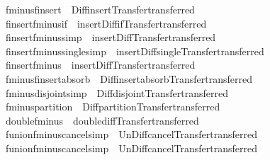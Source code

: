 \begin{isabellebody}
\isamarkupfalse%
\ fminus{\isacharunderscore}finsert{}\ {\isacharequal}\ Diff{\isacharunderscore}insert{}{\isacharbrackleft}Transfer{\isachardot}transferred{\isacharbrackright}\isanewline
{}\isamarkupfalse%
\ finsert{\isacharunderscore}fminus{\isacharunderscore}if\ {\isacharequal}\ insert{\isacharunderscore}Diff{\isacharunderscore}if{\isacharbrackleft}Transfer{\isachardot}transferred{\isacharbrackright}\isanewline
{}\isamarkupfalse%
\ finsert{\isacharunderscore}fminus{}{\isacharbrackleft}simp{\isacharbrackright}\ {\isacharequal}\ insert{\isacharunderscore}Diff{}{\isacharbrackleft}Transfer{\isachardot}transferred{\isacharbrackright}\isanewline
{}\isamarkupfalse%
\ finsert{\isacharunderscore}fminus{\isacharunderscore}single{\isacharbrackleft}simp{\isacharbrackright}\ {\isacharequal}\ insert{\isacharunderscore}Diff{\isacharunderscore}single{\isacharbrackleft}Transfer{\isachardot}transferred{\isacharbrackright}\isanewline
{}\isamarkupfalse%
\ finsert{\isacharunderscore}fminus\ {\isacharequal}\ insert{\isacharunderscore}Diff{\isacharbrackleft}Transfer{\isachardot}transferred{\isacharbrackright}\isanewline
{}\isamarkupfalse%
\ fminus{\isacharunderscore}finsert{\isacharunderscore}absorb\ {\isacharequal}\ Diff{\isacharunderscore}insert{\isacharunderscore}absorb{\isacharbrackleft}Transfer{\isachardot}transferred{\isacharbrackright}\isanewline
{}\isamarkupfalse%
\ fminus{\isacharunderscore}disjoint{\isacharbrackleft}simp{\isacharbrackright}\ {\isacharequal}\ Diff{\isacharunderscore}disjoint{\isacharbrackleft}Transfer{\isachardot}transferred{\isacharbrackright}\isanewline
{}\isamarkupfalse%
\ fminus{\isacharunderscore}partition\ {\isacharequal}\ Diff{\isacharunderscore}partition{\isacharbrackleft}Transfer{\isachardot}transferred{\isacharbrackright}\isanewline
{}\isamarkupfalse%
\ double{\isacharunderscore}fminus\ {\isacharequal}\ double{\isacharunderscore}diff{\isacharbrackleft}Transfer{\isachardot}transferred{\isacharbrackright}\isanewline
{}\isamarkupfalse%
\ funion{\isacharunderscore}fminus{\isacharunderscore}cancel{\isacharbrackleft}simp{\isacharbrackright}\ {\isacharequal}\ Un{\isacharunderscore}Diff{\isacharunderscore}cancel{\isacharbrackleft}Transfer{\isachardot}transferred{\isacharbrackright}\isanewline
{}\isamarkupfalse%
\ funion{\isacharunderscore}fminus{\isacharunderscore}cancel{}{\isacharbrackleft}simp{\isacharbrackright}\ {\isacharequal}\ Un{\isacharunderscore}Diff{\isacharunderscore}cancel{}{\isacharbrackleft}Transfer{\isachardot}transferred{\isacharbrackright}\isanewline

\end{isabellebody}

